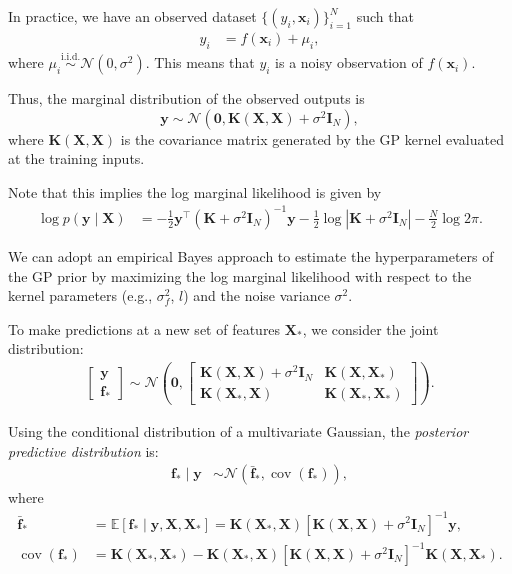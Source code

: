 In practice, we have an observed dataset \( \{(y_i, \mathbf{x}_i)\}_{i=1}^N \) such that
\begin{align*}
	y_i &= f(\mathbf{x}_i) + \mu_i,
\end{align*}
where \( \mu_i \overset{\text{i.i.d.}}{\sim} \mathcal{N}(0, \sigma^2) \). This means that $y_i$ is a noisy observation of $f(\mathbf{x}_i)$.

Thus, the marginal distribution of the observed outputs is
\[
\mathbf{y} \sim \mathcal{N}(\mathbf{0}, \mathbf{K}(\mathbf{X}, \mathbf{X}) + \sigma^2 \mathbf{I}_N),
\]
where \( \mathbf{K}(\mathbf{X}, \mathbf{X}) \) is the covariance matrix generated by the GP kernel evaluated at the training inputs.

Note that this implies the log marginal likelihood is given by
\begin{align*}
	\log p(\mathbf{y} \mid \mathbf{X}) &= -\frac{1}{2} \mathbf{y}^{\top} (\mathbf{K} + \sigma^2 \mathbf{I}_N)^{-1} \mathbf{y} - \frac{1}{2} \log \left| \mathbf{K} + \sigma^2 \mathbf{I}_N \right| - \frac{N}{2} \log 2\pi.
\end{align*}

We can adopt an empirical Bayes approach to estimate the hyperparameters of the GP prior by maximizing the log marginal likelihood with respect to the kernel parameters (e.g., \( \sigma_f^2 \), \( l \)) and the noise variance \( \sigma^2 \).

To make predictions at a new set of features \( \mathbf{X}_* \), we consider the joint distribution:
\begin{align*}
	\begin{bmatrix}
		\mathbf{y} \\
		\mathbf{f}_*
	\end{bmatrix}
	\sim \mathcal{N}\left(
	\mathbf{0},
	\begin{bmatrix}
		\mathbf{K}(\mathbf{X}, \mathbf{X}) + \sigma^2 \mathbf{I}_N & \mathbf{K}(\mathbf{X}, \mathbf{X}_*) \\
		\mathbf{K}(\mathbf{X}_*, \mathbf{X}) & \mathbf{K}(\mathbf{X}_*, \mathbf{X}_*)
	\end{bmatrix}
	\right).
\end{align*}

Using the conditional distribution of a multivariate Gaussian, the \textit{posterior predictive distribution} \cite{rasmussen2006gaussian} is:
\begin{align*}
	\mathbf{f}_* \mid \mathbf{y} &\sim \mathcal{N}(\bar{\mathbf{f}}_*, \operatorname{cov}(\mathbf{f}_*)),
\end{align*}
where
\begin{align*}
	\bar{\mathbf{f}}_* &= \mathbb{E}[\mathbf{f}_* \mid \mathbf{y}, \mathbf{X}, \mathbf{X}_*] = \mathbf{K}(\mathbf{X}_*, \mathbf{X}) [\mathbf{K}(\mathbf{X}, \mathbf{X}) + \sigma^2 \mathbf{I}_N]^{-1} \mathbf{y}, \\
	\operatorname{cov}(\mathbf{f}_*) &= \mathbf{K}(\mathbf{X}_*, \mathbf{X}_*) - \mathbf{K}(\mathbf{X}_*, \mathbf{X}) [\mathbf{K}(\mathbf{X}, \mathbf{X}) + \sigma^2 \mathbf{I}_N]^{-1} \mathbf{K}(\mathbf{X}, \mathbf{X}_*).
\end{align*}

